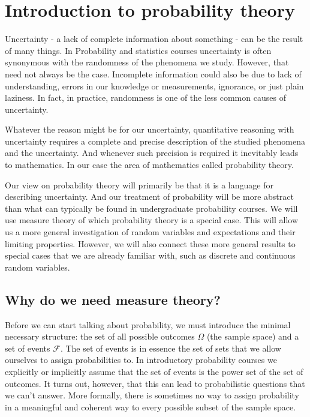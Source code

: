 \documentclass{book}
\theoremstyle{plain}%
\theoremstyle{definition}
\begin{document}
\chapter{Introduction to probability theory}

Uncertainty - a lack of complete information about something - can be the result of many things. In Probability and statistics courses uncertainty is often synonymous with the randomness of the phenomena we study. However, that need not always be the case. Incomplete information could also be due to lack of understanding, errors in our knowledge or measurements, ignorance, or just plain laziness. In fact, in practice, randomness is one of the less common causes of uncertainty.

Whatever the reason might be for our uncertainty, quantitative reasoning with uncertainty requires a complete and precise description of the studied phenomena and the uncertainty. And whenever such precision is required it inevitably leads to mathematics. In our case the area of mathematics called probability theory.

Our view on probability theory will primarily be that it is a language for describing uncertainty. And our treatment of probability will be more abstract than what can typically be found in undergraduate probability courses. We will use measure theory of which probability theory is a special case. This will allow us a more general investigation of random variables and expectations and their limiting properties. However, we will also connect these more general results to special cases that we are already familiar with, such as discrete and continuous random variables.

\section{Why do we need measure theory?}

Before we can start talking about probability, we must introduce the minimal necessary structure: the set of all possible outcomes $\Omega$ (the sample space) and a set of events $\mathcal{F}$. The set of events is in essence the set of sets that we allow ourselves to assign probabilities to. In introductory probability courses we explicitly or implicitly assume that the set of events is the power set of the set of outcomes. It turns out, however, that this can lead to probabilistic questions that we can't answer. More formally, there is sometimes no way to assign probability in a meaningful and coherent way to every possible subset of the sample space.
\end{document}

